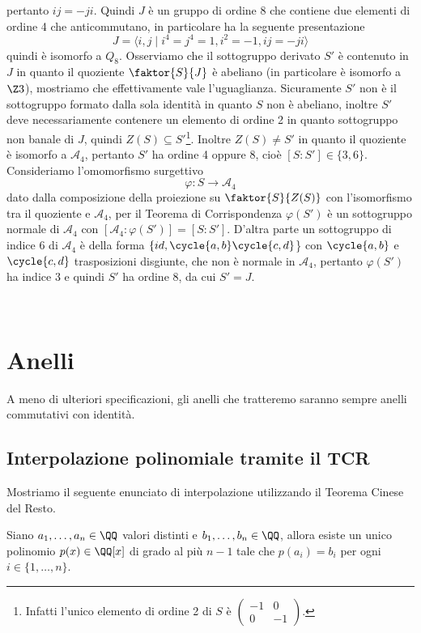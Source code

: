 \documentclass[11pt]{scrartcl}
\begin{document}
	pertanto $ij = -ji$. Quindi $J$ è un gruppo di ordine $8$ che contiene due
	elementi di ordine 4 che anticommutano, in particolare ha la seguente presentazione
	\[
	J = \langle i, j\mid i^4 = j^4 = 1, i^2 = -1, ij = -ji\rangle
	\]
	quindi è isomorfo a $Q_8$. Osserviamo che il sottogruppo derivato $S'$ è 
	contenuto in $J$ in quanto il quoziente $\faktor{S}{J}$ è abeliano (in particolare
	è isomorfo a $\Z3$), mostriamo che effettivamente vale l'uguaglianza. 
	Sicuramente $S'$ non è il sottogruppo formato dalla sola identità in quanto 
	$S$ non è abeliano, inoltre $S'$ deve necessariamente contenere un elemento di 
	ordine 2 in quanto sottogruppo non banale di $J$, quindi $Z(S) \subseteq S'$\footnote{
		Infatti l'unico elemento di ordine 2 di $S$ è $\begin{pmatrix}-1 & 0\\
			0 & -1\end{pmatrix}$.
	}. Inoltre $Z(S) \neq S'$ in quanto il quoziente è isomorfo a $\mathcal{A}_4$,
	pertanto $S'$ ha ordine 4 oppure 8, cioè $[S: S'] \in \{3, 6\}$.
	Consideriamo l'omomorfismo surgettivo 
	\[
	\varphi: S \longrightarrow \mathcal{A}_4
	\]
	dato dalla composizione della proiezione su $\faktor{S}{Z(S)}$ con l'isomorfismo
	tra il quoziente e $\mathcal{A}_4$, per il Teorema di Corrispondenza $\varphi(S')$
	è un sottogruppo normale di $\mathcal{A}_4$ con 
	$[\mathcal{A}_4: \varphi(S')] = [S: S']$. D'altra parte un sottogruppo di 
	indice 6 di $\mathcal{A}_4$ è della forma $\{id, \cycle{a, b}\cycle{c, d}$\}
	con $\cycle{a, b}$ e $\cycle{c, d}$ trasposizioni disgiunte, che non è normale
	in $\mathcal{A}_4$, pertanto $\varphi(S')$ ha indice 3 e quindi $S'$ ha ordine
	8, da cui $S' = J$.
	
	
	\newpage
	\ %
	\newpage
	
	\section{Anelli}
	
	A meno di ulteriori specificazioni, gli anelli che tratteremo saranno sempre 
	anelli commutativi con identità.
	
	\subsection{Interpolazione polinomiale tramite il TCR}
	
	Mostriamo il seguente enunciato di interpolazione utilizzando il Teorema
	Cinese del Resto.
	
	\begin{proposition}
		Siano $a_1, \ldots, a_n \in \QQ$ valori distinti e $b_1, \ldots, b_n \in \QQ$,
		allora esiste un unico polinomio $p(x) \in \QQ[x]$ di grado al più $n - 1$
		tale che $p(a_i) = b_i$ per ogni $i \in \{1, \ldots, n\}$. 
	\end{proposition}
	
\end{document}

